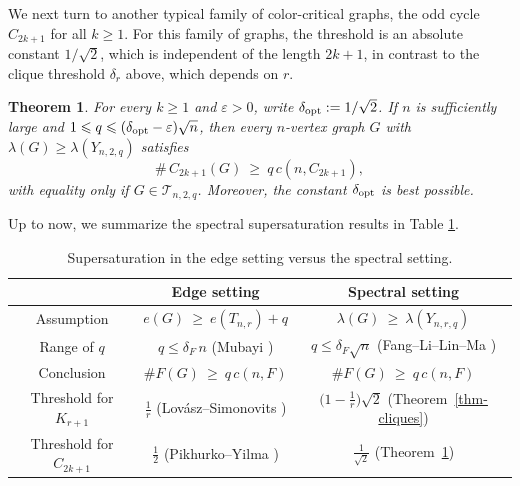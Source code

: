 \documentclass[11pt,a4paper]{article}
\newtheorem{theorem}{Theorem}[section]
\theoremstyle{definition}
\theoremstyle{plain}
\newcommand{\eps}{\varepsilon}
\renewcommand{\le}{\leqslant}
\renewcommand{\ge}{\geqslant}
\begin{document}
We next turn to another typical family of color-critical graphs, the odd cycle $C_{2k+1}$ for all $k\ge 1$.
For this family of graphs, the threshold is an absolute constant  $1/\sqrt2$, which is independent of the length
$2k+1$, in contrast to the clique threshold $\delta_r$ above, which depends on $r$.


\begin{theorem}\label{thm-odd-cycles}
For every $k\ge 1$ and $\eps>0$, write $\delta_{\rm opt} := 1/\sqrt{2}$. If $n$ is sufficiently large and $1\le q\le (\delta_{\rm opt}-\eps)\sqrt n$, then every $n$-vertex graph  $G$ with $\lambda(G)\ge \lambda(Y_{n,2,q})$ satisfies 
$$ \texttt{\#}\, {C_{2k+1}}(G)\ \ge \ q\,c(n,C_{2k+1}),$$
 with equality only if $G\in \mathcal{T}_{n,2,q}$. Moreover, the constant $\delta_{\rm opt}$ is best possible. 
\end{theorem}


Up to now, we summarize the spectral supersaturation results in Table \ref{tab:edge-vs-spec}. 

\begin{table}[htbp]
\centering 
\renewcommand{\arraystretch}{1.3}
\begin{tabular}{@{}ccc@{}}
\toprule
  & Edge setting
  & Spectral setting \\
\midrule
Assumption 
  & $e(G)\ \ge \  e(T_{n,r})+q$
  & $\lambda(G) \  \ge \  \lambda(Y_{n,r,q})$ \\
Range of $q$
  & $q\le \delta_F\, n$
    (Mubayi \cite{Mubayi2010})
  & $q\le \delta_F \sqrt{n}$
    (Fang--Li--Lin--Ma \cite{FLLM2025}) \\
Conclusion
  & $\texttt{\#}F(G) \ \ge \  q\,c(n,F)$
  & $\texttt{\#}F(G) \ \ge  \ q\,c(n,F)$ \\
\hline
Threshold for $K_{r+1}$
  & $\tfrac{1}{r}$
    (Lov\'asz--Simonovits \cite{LS1975})
  & $\bigl(1-\tfrac{1}{r}\bigr)\sqrt{2}$
    (Theorem~\ref{thm-cliques}) \\[2pt]
    \hline 
Threshold for $C_{2k+1}$
  & $\tfrac{1}{2}$
    (Pikhurko--Yilma \cite{PY2017})
  & $\tfrac{1}{\sqrt{2}}$
    (Theorem~\ref{thm-odd-cycles}) \\
\bottomrule
\end{tabular}
\caption{Supersaturation in the edge setting versus the spectral setting.}
\label{tab:edge-vs-spec}
\end{table}
\end{document}
